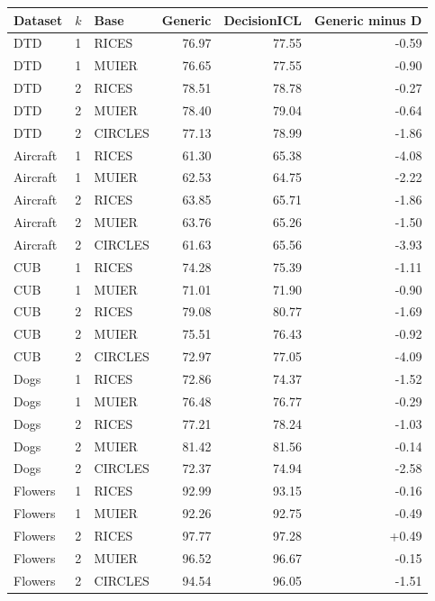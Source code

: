 \begin{tabular}{lllrrr}
\toprule
Dataset & $k$ & Base & Generic & DecisionICL & Generic minus D \\
\midrule
DTD & 1 & RICES & 76.97 & 77.55 & -0.59 \\
DTD & 1 & MUIER & 76.65 & 77.55 & -0.90 \\
DTD & 2 & RICES & 78.51 & 78.78 & -0.27 \\
DTD & 2 & MUIER & 78.40 & 79.04 & -0.64 \\
DTD & 2 & CIRCLES & 77.13 & 78.99 & -1.86 \\
Aircraft & 1 & RICES & 61.30 & 65.38 & -4.08 \\
Aircraft & 1 & MUIER & 62.53 & 64.75 & -2.22 \\
Aircraft & 2 & RICES & 63.85 & 65.71 & -1.86 \\
Aircraft & 2 & MUIER & 63.76 & 65.26 & -1.50 \\
Aircraft & 2 & CIRCLES & 61.63 & 65.56 & -3.93 \\
CUB & 1 & RICES & 74.28 & 75.39 & -1.11 \\
CUB & 1 & MUIER & 71.01 & 71.90 & -0.90 \\
CUB & 2 & RICES & 79.08 & 80.77 & -1.69 \\
CUB & 2 & MUIER & 75.51 & 76.43 & -0.92 \\
CUB & 2 & CIRCLES & 72.97 & 77.05 & -4.09 \\
Dogs & 1 & RICES & 72.86 & 74.37 & -1.52 \\
Dogs & 1 & MUIER & 76.48 & 76.77 & -0.29 \\
Dogs & 2 & RICES & 77.21 & 78.24 & -1.03 \\
Dogs & 2 & MUIER & 81.42 & 81.56 & -0.14 \\
Dogs & 2 & CIRCLES & 72.37 & 74.94 & -2.58 \\
Flowers & 1 & RICES & 92.99 & 93.15 & -0.16 \\
Flowers & 1 & MUIER & 92.26 & 92.75 & -0.49 \\
Flowers & 2 & RICES & 97.77 & 97.28 & +0.49 \\
Flowers & 2 & MUIER & 96.52 & 96.67 & -0.15 \\
Flowers & 2 & CIRCLES & 94.54 & 96.05 & -1.51 \\
\bottomrule
\end{tabular}
